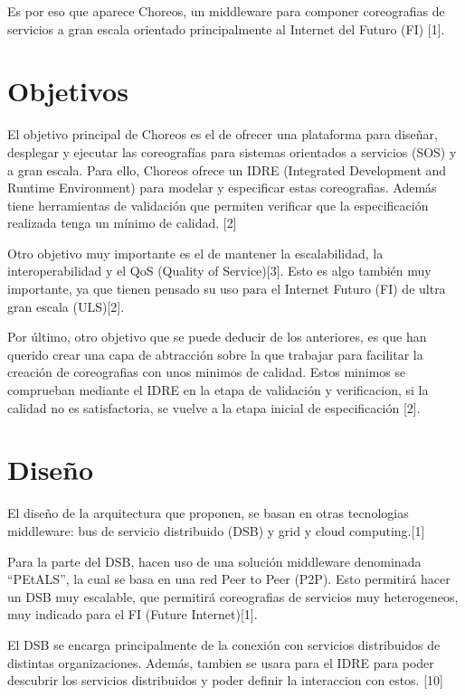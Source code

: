 \documentclass[runningheads]{llncs}
\begin{document}
Es por eso que aparece Choreos, un middleware para componer coreografias de servicios a gran escala orientado principalmente al Internet del Futuro (FI) [1].

\section{Objetivos}
El objetivo principal de Choreos es el de ofrecer una plataforma para diseñar, desplegar y ejecutar las coreografías para sistemas orientados a servicios (SOS) y a gran escala. Para ello, Choreos ofrece un IDRE (Integrated Development and Runtime Environment) para modelar y especificar estas coreografias. Además tiene herramientas de validación que permiten verificar que la especificación realizada tenga un mínimo de calidad. [2]

Otro objetivo muy importante es el de mantener la escalabilidad, la interoperabilidad y el QoS (Quality of Service)[3]. Esto es algo también muy importante, ya que tienen pensado su uso para el Internet Futuro (FI) de ultra gran escala (ULS)[2].

Por último, otro objetivo que se puede deducir de los anteriores, es que han querido crear una capa de abtracción sobre la que trabajar para facilitar la creación de coreografias con unos minimos de calidad. Estos minimos se comprueban mediante el IDRE en la etapa de validación y verificacion, si la calidad no es satisfactoria, se vuelve a la etapa inicial de especificación [2].

\section{Diseño}
El diseño de la arquitectura que proponen, se basan en otras tecnologias middleware: bus de servicio distribuido (DSB) y grid y cloud computing.[1]

Para la parte del DSB, hacen uso de una solución middleware denominada ``PEtALS'', la cual se basa en una red Peer to Peer (P2P). Esto permitirá hacer un DSB muy escalable, que permitirá coreografias de servicios muy heterogeneos, muy indicado para el FI (Future Internet)[1].

El DSB se encarga principalmente de la conexión con servicios distribuidos de distintas organizaciones. Además, tambien se usara para el IDRE para poder descubrir los servicios distribuidos y poder definir la interaccion con estos. [10]
\end{document}
